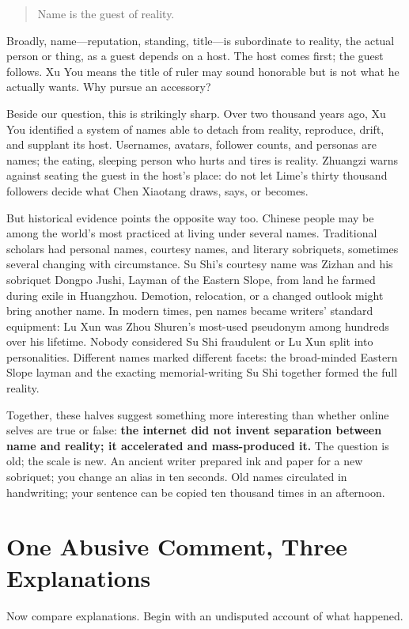 \begin{quote}
Name is the guest of reality.
\end{quote}
Broadly, name---reputation, standing, title---is subordinate to reality, the actual person or thing, as a guest depends on a host. The host comes first; the guest follows. Xu You means the title of ruler may sound honorable but is not what he actually wants. Why pursue an accessory?

Beside our question, this is strikingly sharp. Over two thousand years ago, Xu You identified a system of names able to detach from reality, reproduce, drift, and supplant its host. Usernames, avatars, follower counts, and personas are names; the eating, sleeping person who hurts and tires is reality. Zhuangzi warns against seating the guest in the host's place: do not let Lime's thirty thousand followers decide what Chen Xiaotang draws, says, or becomes.

But historical evidence points the opposite way too. Chinese people may be among the world's most practiced at living under several names. Traditional scholars had personal names, courtesy names, and literary sobriquets, sometimes several changing with circumstance. Su Shi's courtesy name was Zizhan and his sobriquet Dongpo Jushi, Layman of the Eastern Slope, from land he farmed during exile in Huangzhou. Demotion, relocation, or a changed outlook might bring another name. In modern times, pen names became writers' standard equipment: Lu Xun was Zhou Shuren's most-used pseudonym among hundreds over his lifetime. Nobody considered Su Shi fraudulent or Lu Xun split into personalities. Different names marked different facets: the broad-minded Eastern Slope layman and the exacting memorial-writing Su Shi together formed the full reality.

Together, these halves suggest something more interesting than whether online selves are true or false: \textbf{the internet did not invent separation between name and reality; it accelerated and mass-produced it.} The question is old; the scale is new. An ancient writer prepared ink and paper for a new sobriquet; you change an alias in ten seconds. Old names circulated in handwriting; your sentence can be copied ten thousand times in an afternoon.

\section{One Abusive Comment, Three Explanations}
Now compare explanations. Begin with an undisputed account of what happened.

